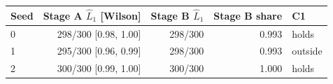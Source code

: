 \begin{tabular}{lrrrl}
\toprule
Seed & Stage A $\hat L_1$ [Wilson] & Stage B $\hat L_1$ & Stage B share & C1 \\
\midrule
0 & 298/300 [0.98, 1.00] & 298/300 & 0.993 & holds \\
1 & 295/300 [0.96, 0.99] & 298/300 & 0.993 & outside \\
2 & 300/300 [0.99, 1.00] & 300/300 & 1.000 & holds \\
\bottomrule
\end{tabular}

